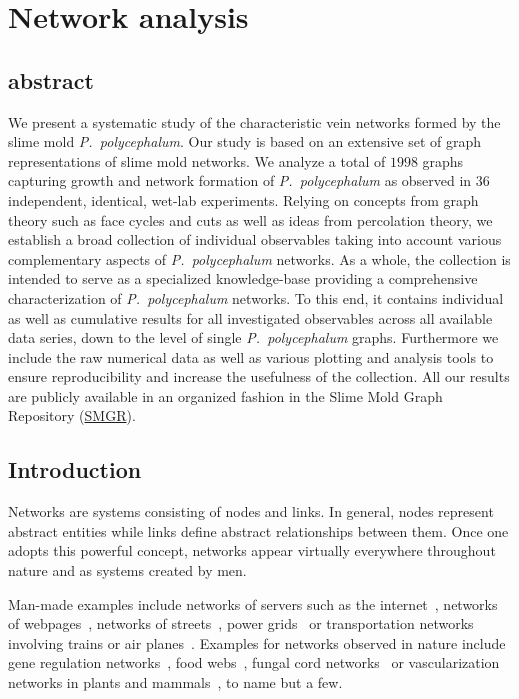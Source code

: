 \chapter{Network analysis}

\section{abstract}

	We present a systematic study of the characteristic vein networks formed by the slime mold \emph{P.~polycephalum}. Our study is based on an extensive set of graph representations of slime mold networks. We analyze a total of $1998$ graphs capturing growth and network formation of \emph{P.~polycephalum} as observed in $36$ independent, identical, wet-lab experiments. Relying on concepts from graph theory such as face cycles and cuts as well as ideas from percolation theory, we establish a broad collection of individual observables taking into account various complementary aspects of \emph{P.~polycephalum} networks. As a whole, the collection is intended to serve as a specialized knowledge-base providing a comprehensive characterization of \emph{P.~polycephalum} networks. To this end, it contains individual as well as cumulative results for all investigated observables across all available data series, down to the level of single \emph{P.~polycephalum} graphs. Furthermore we include the raw numerical data as well as various plotting and analysis tools to ensure reproducibility and increase the usefulness of the collection. All our results are publicly available in an organized fashion in the Slime Mold Graph Repository (\href{http://smgr.mpi-inf.mpg.de}{SMGR}).

\section{Introduction}		%

	Networks are systems consisting of nodes and links. In general, nodes represent abstract entities while links define abstract relationships between them. Once one adopts this powerful concept, networks appear virtually everywhere throughout nature and as systems created by men.

	Man-made examples include networks of servers such as the internet~\cite{faloutsos1999power,karagiannis2004long,huberman1999internet}, networks of webpages~\cite{adamic2000power}, networks of streets~\cite{jiang2004topological,buhl2006topological}, power grids~\cite{rohden2012self,zhongwei2004comparison} or transportation networks involving trains or air planes~\cite{barrat2004weighted,guimera2004modeling,sienkiewicz2005statistical,sen2003small}. Examples for networks observed in nature include gene regulation networks~\cite{alon1999robustness,milo2002network}, food webs~\cite{pimm1991food,montoya2006ecological}, fungal cord networks~\cite{fricker2007network,heaton2012analysis} or vascularization networks in plants and mammals~\cite{katifori2010damage,roth2001evolution,koizumi2000series}, to name but a few. 

